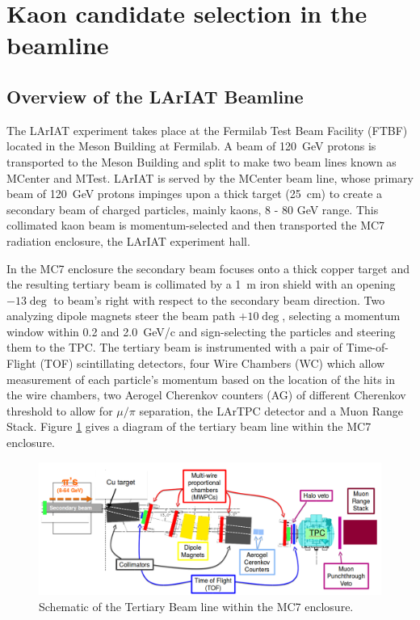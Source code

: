 
\section{Kaon candidate selection in the beamline}\label{sec:BeamlineSelection}
\subsection{Overview of the LArIAT Beamline}\label{sec:BeamlineOverview}
The LArIAT experiment takes place at the Fermilab Test Beam Facility (FTBF) located in the Meson Building at Fermilab. A beam of 120~GeV protons is transported to the Meson Building and split to make two beam lines known as MCenter and MTest. LArIAT is served by the MCenter beam line, whose primary beam of 120~GeV protons impinges upon a thick target (25~cm) to create a secondary beam of charged particles, mainly kaons, 8 - 80 GeV range. This collimated kaon beam is momentum-selected and then transported the MC7 radiation enclosure, the LArIAT experiment hall.  

In the MC7 enclosure the secondary beam focuses onto a thick copper target and the resulting tertiary beam is collimated by a 1~m iron shield with an opening $-13\deg$ to beam's right with respect to the secondary beam direction. Two analyzing dipole magnets steer the beam path $+10\deg$, selecting a momentum window within 0.2 and 2.0~GeV/c and sign-selecting the particles and steering them to the TPC. The tertiary beam is instrumented with a pair of Time-of-Flight (TOF) scintillating detectors,  four Wire Chambers (WC) which allow measurement of each particle's momentum based on the location of the hits in the wire chambers, two Aerogel Cherenkov counters (AG) of different Cherenkov threshold to allow for $\mu / \pi$ separation, the LArTPC detector and a Muon Range Stack. Figure \ref{fig:beamlineschematic} gives a diagram of the tertiary beam line within the MC7 enclosure.

\begin{figure}[htb]
\begin{center}
\includegraphics[scale=0.25]{./images/mc7beamline.png}
\end{center}
\caption{Schematic of the Tertiary Beam line within the MC7 enclosure.}
\label{fig:beamlineschematic}
\end{figure}

